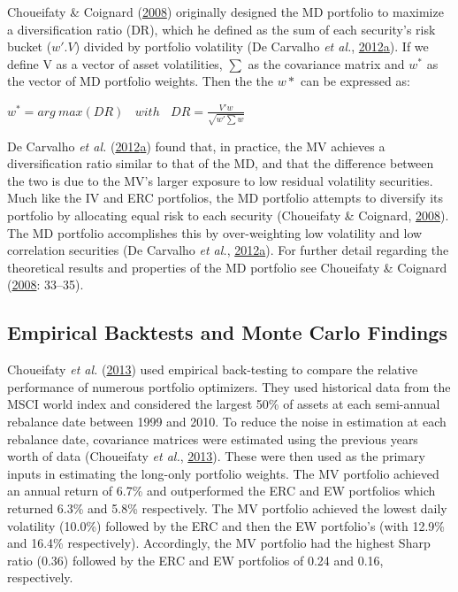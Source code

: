 \documentclass[11pt,preprint, authoryear]{elsarticle}
\numberwithin{equation}{section}
\numberwithin{figure}{section}
\numberwithin{table}{section}
\begin{document}
Choueifaty \& Coignard (\protect\hyperlink{ref-choueifaty2008}{2008})
originally designed the MD portfolio to maximize a diversification ratio
(DR), which he defined as the sum of each security's risk bucket
(\(w'.V\)) divided by portfolio volatility (De Carvalho \emph{et al.},
\protect\hyperlink{ref-leote}{2012}\protect\hyperlink{ref-leote}{a}). If
we define V as a vector of asset volatilities, \(\sum\) as the
covariance matrix and \(w^*\) as the vector of MD portfolio weights.
Then the the \(w*\) can be expressed as:

\begin{center} 
$w^* =arg\ max(DR)\ \ \ \ with \ \ \ \  DR= \frac{V'w}{\sqrt{w'\sum w}}$ 
\end{center}

De Carvalho \emph{et al.}
(\protect\hyperlink{ref-leote}{2012}\protect\hyperlink{ref-leote}{a})
found that, in practice, the MV achieves a diversification ratio similar
to that of the MD, and that the difference between the two is due to the
MV's larger exposure to low residual volatility securities. Much like
the IV and ERC portfolios, the MD portfolio attempts to diversify its
portfolio by allocating equal risk to each security (Choueifaty \&
Coignard, \protect\hyperlink{ref-choueifaty2008}{2008}). The MD
portfolio accomplishes this by over-weighting low volatility and low
correlation securities (De Carvalho \emph{et al.},
\protect\hyperlink{ref-leote}{2012}\protect\hyperlink{ref-leote}{a}).
For further detail regarding the theoretical results and properties of
the MD portfolio see Choueifaty \& Coignard
(\protect\hyperlink{ref-choueifaty2008}{2008}: 33--35).

\hypertarget{empirical-backtests-and-monte-carlo-findings}{%
\subsection{Empirical Backtests and Monte Carlo
Findings}\label{empirical-backtests-and-monte-carlo-findings}}

Choueifaty \emph{et al.} (\protect\hyperlink{ref-choueifaty2013}{2013})
used empirical back-testing to compare the relative performance of
numerous portfolio optimizers. They used historical data from the MSCI
world index and considered the largest 50\% of assets at each
semi-annual rebalance date between 1999 and 2010. To reduce the noise in
estimation at each rebalance date, covariance matrices were estimated
using the previous years worth of data (Choueifaty \emph{et al.},
\protect\hyperlink{ref-choueifaty2013}{2013}). These were then used as
the primary inputs in estimating the long-only portfolio weights. The MV
portfolio achieved an annual return of 6.7\% and outperformed the ERC
and EW portfolios which returned 6.3\% and 5.8\% respectively. The MV
portfolio achieved the lowest daily volatility (10.0\%) followed by the
ERC and then the EW portfolio's (with 12.9\% and 16.4\% respectively).
Accordingly, the MV portfolio had the highest Sharp ratio (0.36)
followed by the ERC and EW portfolios of 0.24 and 0.16, respectively.
\end{document}
